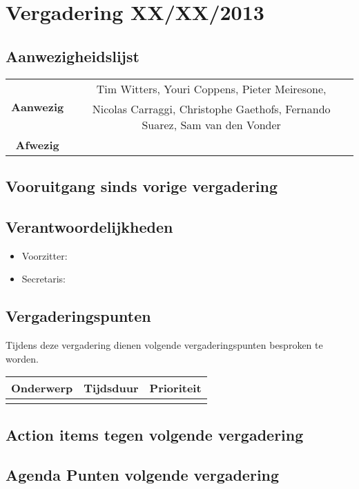 \section{Vergadering XX/XX/2013}
\subsection{Aanwezigheidslijst}
\begin{table}[htbp]
	\centering
	\begin{tabular}{c|c}
		\multirow{2}{*}{\textbf{Aanwezig}} & Tim Witters, Youri Coppens, Pieter Meiresone, \\
		& Nicolas Carraggi,  Christophe Gaethofs, Fernando Suarez, Sam van den Vonder \\
		\hline
		\textbf{Afwezig} & \\
	\end{tabular}
\end{table}

\subsection{Vooruitgang sinds vorige vergadering}
\subsection{Verantwoordelijkheden}
\begin{itemize}
	\item Voorzitter:
	\item Secretaris:
\end{itemize}
\subsection{Vergaderingspunten}
Tijdens deze vergadering dienen volgende vergaderingspunten besproken te worden.
\begin{table} [H]
	\centering
	\begin{tabular} {l|cl}
		Onderwerp & Tijdsduur & Prioriteit \\ %
		\hline
		& &
	\end{tabular}
\end{table}
\subsection{Action items tegen volgende vergadering}
\subsection{Agenda Punten volgende vergadering}

